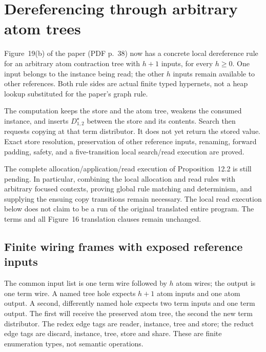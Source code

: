 \clearpage
\section{Dereferencing through arbitrary atom trees}
\label{sec:copying-dereference}
Figure~19(b) of the paper (PDF p.~38) now has a concrete local dereference
rule for an arbitrary atom contraction tree with $h+1$ inputs, for every
$h\geq0$. One input belongs to the instance being read; the other $h$ inputs
remain available to other references. Both rule sides are actual finite typed
hypernets, not a heap lookup substituted for the paper's graph rule.

The computation keeps the store and the atom tree, weakens the consumed
instance, and inserts $D^{\star}_{1,2}$ between the store and its contents.
Search then requests copying at that term distributor. It does not yet return
the stored value. Exact store resolution, preservation of other reference
inputs, renaming, forward padding, safety, and a five-transition local
search/read execution are proved.

The complete allocation/application/read execution of Proposition~12.2 is
still pending. In particular, combining the local allocation and read rules
with arbitrary focused contexts, proving global rule matching and determinism,
and supplying the ensuing copy transitions remain necessary. The local read
execution below does not claim to be a run of the original translated entire
program. The terms and all Figure~16 translation clauses remain unchanged.

\subsection{Finite wiring frames with exposed reference inputs}

The common input list is one term wire followed by $h$ atom wires; the output
is one term wire. A named tree hole expects $h+1$ atom inputs and one atom
output. A second, differently named hole expects two term inputs and one term
output. The first will receive the preserved atom tree, the second the new
term distributor. The redex edge tags are reader, instance, tree and store;
the reduct edge tags are discard, instance, tree, store and share. These are
finite enumeration types, not semantic operations.



